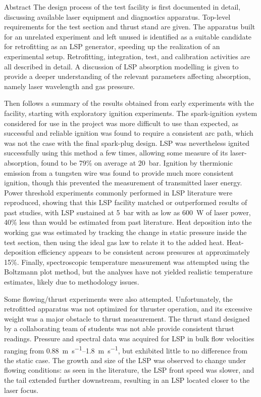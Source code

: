\begin{plainchp}{Abstract}
    The design process of the test facility is first documented in detail, discussing available laser equipment and diagnostics apparatus. Top-level requirements for the test section and thrust stand are given. The apparatus built for an unrelated experiment and left unused is identified as a suitable candidate for retrofitting as an LSP generator, speeding up the realization of an experimental setup. Retrofitting, integration, test, and calibration activities are all described in detail. A discussion of LSP absorption modelling is given to provide a deeper understanding of the relevant parameters affecting absorption, namely laser wavelength and gas pressure. 

    Then follows a summary of the results obtained from early experiments with the facility, starting with exploratory ignition experiments. The spark-ignition system considered for use in the project was more difficult to use than expected, as successful and reliable ignition was found to require a consistent arc path, which was not the case with the final spark-plug design. LSP was nevertheless ignited successfully using this method a few times, allowing some measure of its laser-absorption, found to be 79\% on average at \qty{20}{bar}. Ignition by thermionic emission from a tungsten wire was found to provide much more consistent ignition, though this prevented the measurement of transmitted laser energy. Power threshold experiments commonly performed in LSP literature were reproduced, showing that this LSP facility matched or outperformed results of past studies, with LSP sustained at \qty{5}{bar} with as low as \qty{600}{W} of laser power, 40\% less than would be estimated from past literature. Heat deposition into the working gas was estimated by tracking the change in static pressure inside the test section, then using the ideal gas law to relate it to the added heat. Heat-deposition efficiency appears to be consistent across pressures at approximately 15\%. Finally, spectroscopic temperature measurement was attempted using the Boltzmann plot method, but the analyses have not yielded realistic temperature estimates, likely due to methodology issues.

    Some flowing/thrust experiments were also attempted. Unfortunately, the retrofitted apparatus was not optimized for thruster operation, and its excessive weight was a major obstacle to thrust measurement. The thrust stand designed by a collaborating team of students was not able provide consistent thrust readings. Pressure and spectral data was acquired for LSP in bulk flow velocities ranging from \qtyrange{0.88}{1.8}{m.s^{-1}}, but exhibited little to no difference from the static case. The growth and size of the LSP was observed to change under flowing conditions: as seen in the literature, the LSP front speed was slower, and the tail extended further downstream, resulting in an LSP located closer to the laser focus.


\end{plainchp}

